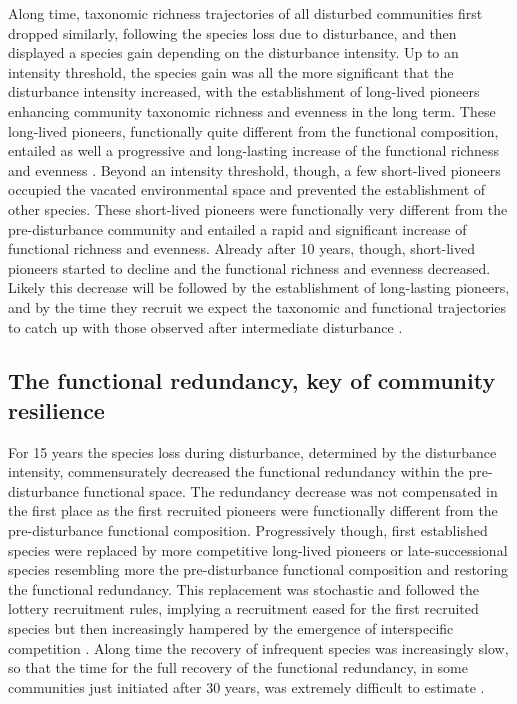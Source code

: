 \documentclass[fleqn,10pt]{ArtEcoFoG} %
\begin{document}
Along time, taxonomic richness trajectories of all disturbed communities
first dropped similarly, following the species loss due to disturbance,
and then displayed a species gain depending on the disturbance
intensity. Up to an intensity threshold, the species gain was all the
more significant that the disturbance intensity increased, with the
establishment of long-lived pioneers enhancing community taxonomic
richness and evenness in the long term. These long-lived pioneers,
functionally quite different from the functional composition, entailed
as well a progressive and long-lasting increase of the functional
richness and evenness \citep{Denslow1980, Molino2001}. Beyond an
intensity threshold, though, a few short-lived pioneers occupied the
vacated environmental space and prevented the establishment of other
species. These short-lived pioneers were functionally very different
from the pre-disturbance community and entailed a rapid and significant
increase of functional richness and evenness. Already after 10 years,
though, short-lived pioneers started to decline and the functional
richness and evenness decreased. Likely this decrease will be followed
by the establishment of long-lasting pioneers, and by the time they
recruit we expect the taxonomic and functional trajectories to catch up
with those observed after intermediate disturbance \citep{Walker2009}.

\subsection{The functional redundancy, key of community
resilience}\label{the-functional-redundancy-key-of-community-resilience}

For 15 years the species loss during disturbance, determined by the
disturbance intensity, commensurately decreased the functional
redundancy within the pre-disturbance functional space. The redundancy
decrease was not compensated in the first place as the first recruited
pioneers were functionally different from the pre-disturbance functional
composition. Progressively though, first established species were
replaced by more competitive long-lived pioneers or late-successional
species resembling more the pre-disturbance functional composition and
restoring the functional redundancy. This replacement was stochastic and
followed the lottery recruitment rules, implying a recruitment eased for
the first recruited species but then increasingly hampered by the
emergence of interspecific competition \citep{Busing2002}. Along time
the recovery of infrequent species was increasingly slow, so that the
time for the full recovery of the functional redundancy, in some
communities just initiated after 30 years, was extremely difficult to
estimate \citep{Elmqvist2003, Diaz2005}.
\end{document}
